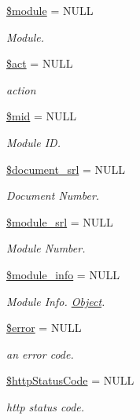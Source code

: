 \begin{DoxyCompactItemize}
\item 
\hyperlink{classModuleHandler_a24f28ac6c101582f043bef672a9f3b00}{\$module} = N\-U\-L\-L
\begin{DoxyCompactList}\small\item\em Module. \end{DoxyCompactList}\item 
\hyperlink{classModuleHandler_ae332c92a6ad1e9e823281d708088a0ff}{\$act} = N\-U\-L\-L
\begin{DoxyCompactList}\small\item\em action \end{DoxyCompactList}\item 
\hyperlink{classModuleHandler_a6bb7e9e29c0fb9893d051179281b093e}{\$mid} = N\-U\-L\-L
\begin{DoxyCompactList}\small\item\em Module I\-D. \end{DoxyCompactList}\item 
\hyperlink{classModuleHandler_acf9f6062042025aab6a7e10f6b261909}{\$document\-\_\-srl} = N\-U\-L\-L
\begin{DoxyCompactList}\small\item\em Document Number. \end{DoxyCompactList}\item 
\hyperlink{classModuleHandler_ad79751537e64d7bfc7dc6fa4280043b0}{\$module\-\_\-srl} = N\-U\-L\-L
\begin{DoxyCompactList}\small\item\em Module Number. \end{DoxyCompactList}\item 
\hyperlink{classModuleHandler_a2388e5ef665a5a82efa00c8c894df33c}{\$module\-\_\-info} = N\-U\-L\-L
\begin{DoxyCompactList}\small\item\em Module Info. \hyperlink{classObject}{Object}. \end{DoxyCompactList}\item 
\hyperlink{classModuleHandler_ad81b78f21e42724e73da6808c561159c}{\$error} = N\-U\-L\-L
\begin{DoxyCompactList}\small\item\em an error code. \end{DoxyCompactList}\item 
\hyperlink{classModuleHandler_a033e864206ca6a6494af015baa5d2365}{\$http\-Status\-Code} = N\-U\-L\-L
\begin{DoxyCompactList}\small\item\em http status code. \end{DoxyCompactList}\end{DoxyCompactItemize}


